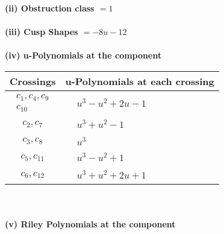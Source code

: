 \documentclass[1p]{elsarticle_modified}
\theoremstyle{definition}
\begin{document}
\flushleft \textbf{(ii) Obstruction class $= 1$}\\~\\
\flushleft \textbf{(iii) Cusp Shapes $= -8 u-12$}\\~\\
\newpage\renewcommand{\arraystretch}{1}
\flushleft \textbf{(iv) u-Polynomials at the component}\newline \\
\begin{tabular}{m{50pt}|m{274pt}}
Crossings & \hspace{64pt}u-Polynomials at each crossing \\
\hline $$\begin{aligned}c_{1},c_{4},c_{9}\\c_{10}\end{aligned}$$&$\begin{aligned}
&u^3- u^2+2 u-1
\end{aligned}$\\
\hline $$\begin{aligned}c_{2},c_{7}\end{aligned}$$&$\begin{aligned}
&u^3+u^2-1
\end{aligned}$\\
\hline $$\begin{aligned}c_{3},c_{8}\end{aligned}$$&$\begin{aligned}
&u^3
\end{aligned}$\\
\hline $$\begin{aligned}c_{5},c_{11}\end{aligned}$$&$\begin{aligned}
&u^3- u^2+1
\end{aligned}$\\
\hline $$\begin{aligned}c_{6},c_{12}\end{aligned}$$&$\begin{aligned}
&u^3+u^2+2 u+1
\end{aligned}$\\
\hline
\end{tabular}\\~\\
\newpage\renewcommand{\arraystretch}{1}
\flushleft \textbf{(v) Riley Polynomials at the component}\newline \\
\end{document}
